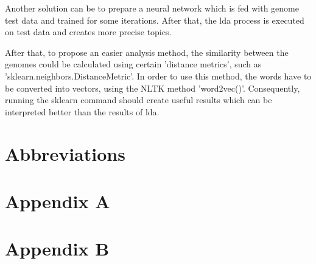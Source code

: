 Another solution can be to prepare a neural network which is fed with genome test data and trained for some iterations. After that, the \ac{lda} process is executed on test data and creates more precise topics.  

After that, to propose an easier analysis method, the similarity between the genomes could be calculated using certain 'distance metrics', such as 'sklearn.neighbors.DistanceMetric'. In order to use this method, the words have to be converted into vectors, using the NLTK method 'word2vec()'. Consequently, running the sklearn command should create useful results which can be interpreted better than the results of \ac{lda}.

\chapter{Abbreviations}

\printbibliography

\chapter{Appendix A}\label{appendix a}

\chapter{Appendix B}\label{appendix b}



